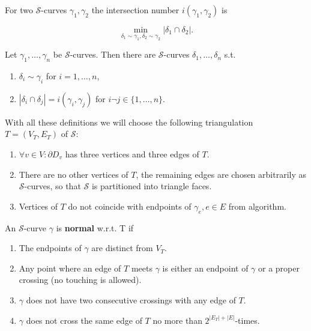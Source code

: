 \begin{defn}
	For two $\mathcal{S}$-curves $\gamma_1, \gamma_2$ the intersection number $i(\gamma_1, \gamma_2)$ is
	
	$$
	\min_{\delta_1 \sim \gamma_1, \delta_2 \sim \gamma_2} |\delta_1 \cap \delta_2|.
	$$
\end{defn}

\begin{fact}
	Let $\gamma_1, \dots, \gamma_n$ be $\mathcal{S}$-curves. Then there are $\mathcal{S}$-curves $\delta_1, \dots, \delta_n$ s.t.
	
	\begin{enumerate}
		\item $\delta_i \sim \gamma_i$ for $i = 1, \dots, n$,
		\item $|\delta_i \cap \delta_j| = i(\gamma_i, \gamma_j)$ for $i\neg j \in \{1, \dots, n\}$. 
	\end{enumerate}
\end{fact}

\noindent
With all these definitions we will choose the following triangulation $T = (V_T, E_T)$ of $\mathcal{S}$:

\begin{enumerate}
	\item $\forall v \in V: \partial D_v$ has three vertices and three edges of $T$.
	\item There are no other vertices of $T$, the remaining edges are chosen arbitrarily as $\mathcal{S}$-curves, so that $\mathcal{S}$ is partitioned into triangle faces.
	\item Vertices of $T$ do not coincide with endpoints of $\gamma_e, e \in E$ from algorithm.
\end{enumerate}

\begin{defn}
	An $\mathcal{S}$-curve $\gamma$ is \textbf{normal} w.r.t. T if
	
	\begin{enumerate}
		\item The endpoints of $\gamma$ are distinct from $V_T$.
		\item Any point where an edge of $T$ meets $\gamma$ is either an endpoint of $\gamma$ or a proper crossing (no touching is allowed).
		\item $\gamma$ does not have two consecutive crossings with any edge of $T$.
		\item $\gamma$ does not cross the same edge of $T$ no more than $2^{|E_T| + |E|}$-times.
	\end{enumerate}
\end{defn}

